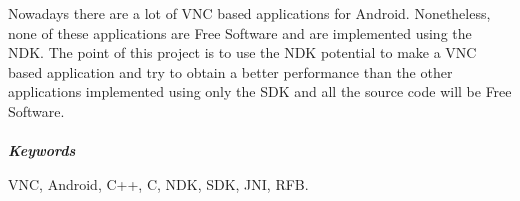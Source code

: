 
Nowadays there are a lot of VNC based applications for Android. Nonetheless, none of these applications are Free Software and are implemented using the NDK. The point of this project is to use the NDK potential to make a VNC based application and try to obtain a better performance than the other applications implemented using only the SDK and all the source code will be Free Software.
\\ \mbox{ } \\
\textit{\textbf{Keywords}}

VNC, Android, C++, C, NDK, SDK, JNI, RFB.
